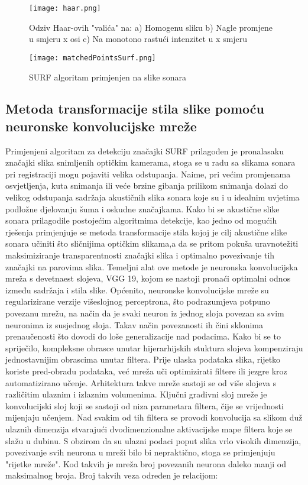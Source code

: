 \documentclass[times, utf8, diplomski]{fer}
\begin{document}
\begin{figure}
\texttt{[image: haar.png]}
		\caption{Odziv Haar-ovih "valića" na: a) Homogenu sliku b) Nagle promjene u smjeru x osi c) Na monotono rastući intenzitet u x smjeru }
		\label{fig:Uspješna registracija dviju akustičnih slika FLS-a}
\end{figure}
\begin{figure}
\texttt{[image: matchedPointsSurf.png]}
		\caption{SURF algoritam primjenjen na slike sonara }
		\label{fig:Uspješna registracija dviju akustičnih slika FLS-a}
\end{figure}
\subsection{Metoda transformacije stila slike pomoću neuronske konvolucijske mreže}
Primjenjeni algoritam za detekciju značajki SURF prilagođen je pronalasaku značajki slika snimljenih optičkim kamerama, stoga se u radu sa slikama sonara pri registraciji mogu pojaviti velika odstupanja. Naime, pri većim promjenama osvjetljenja, kuta snimanja ili veće brzine gibanja prilikom snimanja dolazi do velikog odstupanja sadržaja akustičnih slika sonara koje su i u idealnim uvjetima podložne djelovanju šuma i oskudne značajkama. Kako bi se akustične slike sonara prilagodile postojećim algoritmima detekcije, kao jedno od mogućih rješenja primjenjuje se metoda transformacije stila kojoj je cilj akustične slike sonara učiniti što sličnijima optičkim slikama,a da se pritom pokuša uravnotežiti maksimiziranje transparentnosti značajki slika i optimalno povezivanje tih značajki na parovima slika. Temeljni alat ove metode je neuronska konvolucijska mreža s devetnaest slojeva, VGG 19, kojom se nastoji pronaći optimalni odnos između sadržaja i stila slike. Općenito, neuronske konvolucijske mreže su regularizirane verzije višeslojnog perceptrona, što podrazumjeva potpuno povezanu mrežu, na način da je svaki neuron iz jednog sloja povezan sa svim neuronima iz susjednog sloja. Takav način povezanosti ih čini sklonima prenaučenosti što dovodi do loše generalizacije nad podacima. Kako bi se to spriječilo, kompleksne obrasce unutar hijerarhijskih stuktura slojeva kompenziraju jednostavnijim obrascima unutar filtera. Prije ulaska podataka slika, rijetko koriste pred-obradu podataka, već mreža uči optimizirati filtere ili jezgre kroz automatizirano učenje. Arhitektura takve mreže sastoji se od više slojeva s različitim ulaznim i izlaznim volumenima. Ključni gradivni sloj mreže je konvolucijski sloj koji se sastoji od niza parametara filtera, čije se vrijednosti mijenjaju učenjem. Nad svakim od tih filtera se provodi konvolucija sa slikom duž ulaznih dimenzija stvarajući dvodimenzionalne aktivacijske mape filtera koje se slažu u dubinu. S obzirom da su ulazni podaci poput slika vrlo visokih dimenzija, povezivanje svih neurona u mreži bilo bi nepraktično, stoga se primjenjuju "rijetke mreže". Kod takvih je mreža broj povezanih neurona daleko manji od maksimalnog broja. Broj takvih veza određen je relacijom:
\end{document}
